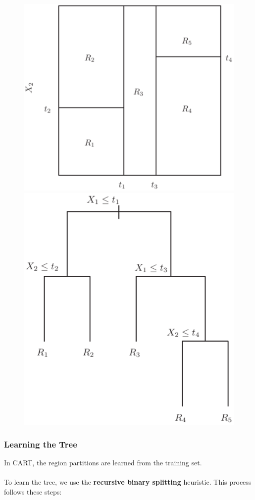 \documentclass{article}
\begin{document}
\begin{figure}[H]
   \begin{minipage}{0.48\textwidth}
     \centering
     \includegraphics[width=.9\linewidth]{assets/cart.png}
   \end{minipage}\hfill
   \begin{minipage}{0.48\textwidth}
     \centering
     \includegraphics[width=.7\linewidth]{assets/cart_tree.png}
   \end{minipage}
\end{figure}

\subsubsection{Learning the Tree}
In CART, the region partitions are learned from the training set. \\ \\
To learn the tree, we use the \textbf{recursive binary splitting} heuristic. This process follows these steps:
\end{document}
